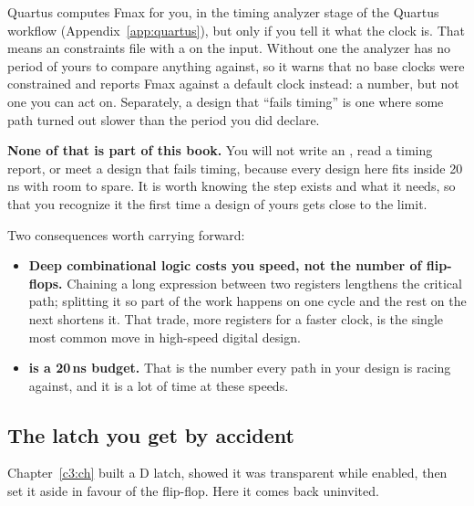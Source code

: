 Quartus computes Fmax for you, in the timing analyzer stage of the Quartus workflow
(Appendix~\ref{app:quartus}), but only if you tell it what the clock is. That means an 
constraints file with a  on the  input. Without one the analyzer has
no period of yours to compare anything against, so it warns that no base clocks were constrained
and reports Fmax against a default clock instead: a number, but not one you can act on. Separately,
a design that ``fails timing'' is one where some path turned out slower than the period you did
declare.

\textbf{None of that is part of this book.} You will not write an , read a timing
report, or meet a design that fails timing, because every design here fits inside 20\,ns with room
to spare. It is worth knowing the step exists and what it needs, so that you recognize it the first
time a design of yours gets close to the limit.

\noindent Two consequences worth carrying forward:
\begin{itemize}
  \item \textbf{Deep combinational logic costs you speed, not the number of flip-flops.} Chaining a
    long expression between two registers lengthens the critical path; splitting it so part of the
    work happens on one cycle and the rest on the next shortens it. That trade, more registers for a
    faster clock, is the single most common move in high-speed digital design.
  \item \textbf{ is a 20\,ns budget.} That is the number every path in your design is
    racing against, and it is a lot of time at these speeds.
\end{itemize}

\subsection{The latch you get by accident}
\label{c5:latch}
Chapter~\ref{c3:ch} built a D latch, showed it was transparent while enabled, then set it aside in
favour of the flip-flop. Here it comes back uninvited.

